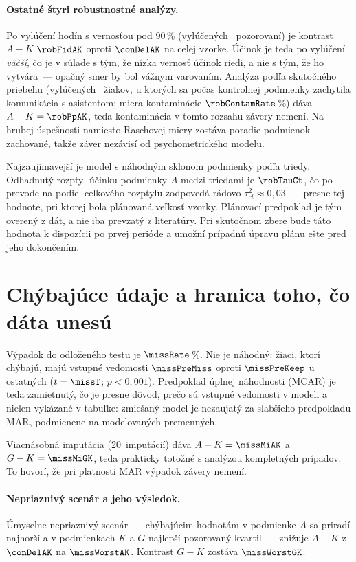 \paragraph{Ostatné štyri robustnostné analýzy.} Po vylúčení hodín s vernosťou pod 90\,\% (vylúčených \robFidExcl{}~pozorovaní) je kontrast $A-K$ $\robFidAK$ oproti $\conDelAK$ na celej vzorke. Účinok je teda po vylúčení \emph{väčší}, čo je v súlade s tým, že nízka vernosť účinok riedi, a nie s tým, že ho vytvára~--- opačný smer by bol vážnym varovaním. Analýza podľa skutočného priebehu (vylúčených \robPpExcl{}~žiakov, u ktorých sa počas kontrolnej podmienky zachytila komunikácia s asistentom; miera kontaminácie $\robContamRate$\,\%) dáva $A-K = \robPpAK$, teda kontaminácia v tomto rozsahu závery nemení. Na hrubej úspešnosti namiesto Raschovej miery zostáva poradie podmienok zachované, takže záver nezávisí od psychometrického modelu.

Najzaujímavejší je model s náhodným sklonom podmienky podľa triedy. Odhadnutý rozptyl účinku podmienky $A$ medzi triedami je $\robTauCt$, čo po prevode na podiel celkového rozptylu zodpovedá rádovo $\tau^2_{ct} \approx 0{,}03$~--- presne tej hodnote, pri ktorej bola plánovaná veľkosť vzorky. Plánovací predpoklad je tým overený z dát, a nie iba prevzatý z literatúry. Pri skutočnom zbere bude táto hodnota k dispozícii po prvej perióde a umožní prípadnú úpravu plánu ešte pred jeho dokončením.

\section{Chýbajúce údaje a hranica toho, čo dáta unesú}

Výpadok do odloženého testu je $\missRate$\,\%. Nie je náhodný: žiaci, ktorí chýbajú, majú vstupné vedomosti $\missPreMiss$ oproti $\missPreKeep$ u ostatných ($t=\missT$; $p<0{,}001$). Predpoklad úplnej náhodnosti (MCAR) je teda zamietnutý, čo je presne dôvod, prečo sú vstupné vedomosti v modeli a nielen vykázané v tabuľke: zmiešaný model je nezaujatý za slabšieho predpokladu MAR, podmienene na modelovaných premenných.

Viacnásobná imputácia (20~imputácií) dáva $A-K = \missMiAK$ a $G-K = \missMiGK$, teda prakticky totožné s analýzou kompletných prípadov. To hovorí, že pri platnosti MAR výpadok závery nemení.

\paragraph{Nepriaznivý scenár a jeho výsledok.} Úmyselne nepriaznivý scenár~--- chýbajúcim hodnotám v podmienke $A$ sa priradí najhorší a v podmienkach $K$ a $G$ najlepší pozorovaný kvartil~--- znižuje $A-K$ z $\conDelAK$ na $\missWorstAK$. Kontrast $G-K$ zostáva $\missWorstGK$.


